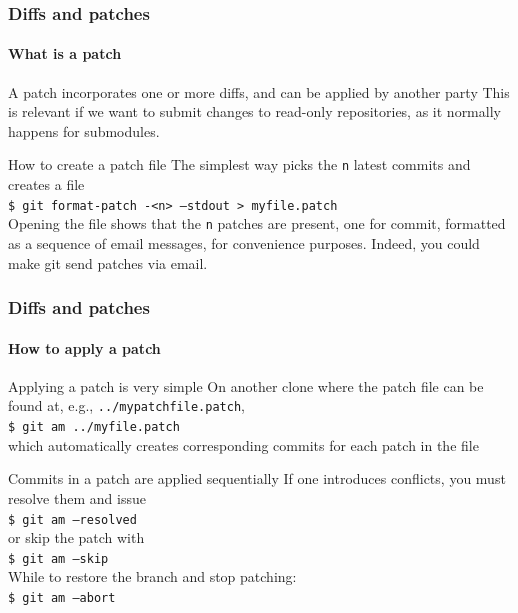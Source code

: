 \begin{frame}
\frametitle{Diffs and patches}
\framesubtitle{What is a patch}

\begin{block}{A patch incorporates one or more diffs, and can be applied by another party}
This is relevant if we want to submit changes to read-only repositories, as it normally happens for submodules.
\end{block}
\pause

\begin{block}{How to create a patch file}
The simplest way picks the \texttt{n} latest commits and creates a file \\
\texttt{\$ git format-patch -<n> ---stdout > myfile.patch} \\
\medskip
Opening the file shows that the \texttt{n} patches are present, one for commit, formatted as a sequence of email messages, for convenience purposes. 
Indeed, you could make git send patches via email.
\end{block}

\end{frame}

\begin{frame}
\frametitle{Diffs and patches}
\framesubtitle{How to apply a patch}

\begin{block}{Applying a patch is very simple}
On another clone where the patch file can be found at, e.g., \texttt{../mypatchfile.patch}, \\
\texttt{\$ git am ../myfile.patch} \\
which automatically creates corresponding commits for each patch in the file
\end{block}
\pause
\begin{block}{Commits in a patch are applied sequentially}
If one introduces conflicts, you must resolve them and issue \\
\texttt{\$ git am ---resolved} \\
or skip the patch with \\
\texttt{\$ git am ---skip} \\
While to restore the branch and stop patching: \\
\texttt{\$ git am ---abort}
\end{block}

\end{frame}

